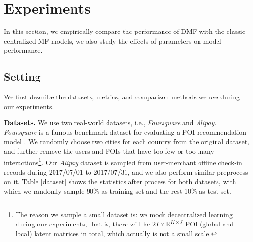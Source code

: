\section{Experiments}\label{experiments}
In this section, we empirically compare the performance of DMF with the classic centralized MF models, we also study the effects of parameters on model performance. 

\subsection{Setting}
We first describe the datasets, metrics, and comparison methods we use during our experiments. 

\textbf{Datasets.} We use two real-world datasets, i.e., \emph{Foursquare} and \emph{Alipay}. %
\emph{Foursquare} is a famous benchmark dataset for evaluating a POI recommendation model \cite{yang2016participatory}. 
We randomly choose two cities for each country from the original dataset, and further remove the users and POIs that have too few or too many interactions\footnote{The reason we sample a small dataset is: we mock decentralized learning during our experiments, that is, there will be $2I \times \mathbb{R}^{K\times{}J}$ POI (global and local) latent matrices in total, which actually is not a small scale.}. 
Our \emph{Alipay} dataset is sampled from user-merchant offline check-in records during 2017/07/01 to 2017/07/31, and we also perform similar preprocess on it. 
Table \ref{dataset} shows the statistics after process for both datasets, with which we randomly sample 90\% as training set and the rest 10\% as test set. 

